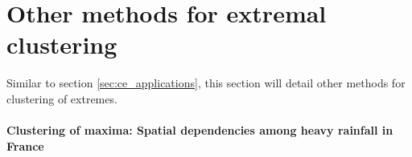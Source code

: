 \documentclass{article}
\numberwithin{equation}{section}
\begin{document}
\newpage
\section{Other methods for extremal clustering}

Similar to section \ref{sec:ce_applications}, this section will detail other methods for clustering of extremes. 


\paragraph{Clustering of maxima: Spatial dependencies among heavy rainfall in France}
\end{document}
